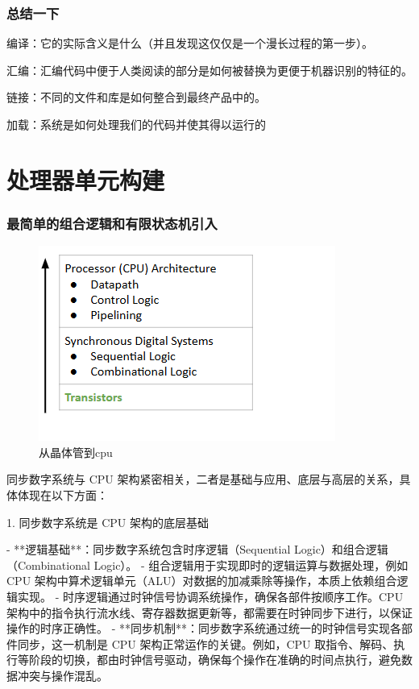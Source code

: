 \documentclass{ctexart}
\begin{document}
\subsubsection{总结一下}
编译：它的实际含义是什么（并且发现这仅仅是一个漫长过程的第一步）。\par
汇编：汇编代码中便于人类阅读的部分是如何被替换为更便于机器识别的特征的。\par
链接：不同的文件和库是如何整合到最终产品中的。\par
加载：系统是如何处理我们的代码并使其得以运行的\par
\section{处理器单元构建}
\subsubsection{最简单的组合逻辑和有限状态机引入}
\begin{figure}
    \centering
    \includegraphics[width=0.5\linewidth]{从晶体管到cpu.png}
    \caption{从晶体管到cpu}
    \label{fig:enter-label}
\end{figure}

同步数字系统与 CPU 架构紧密相关，二者是基础与应用、底层与高层的关系，具体体现在以下方面：  \par

1. 同步数字系统是 CPU 架构的底层基础  \par
- **逻辑基础**：同步数字系统包含时序逻辑（Sequential Logic）和组合逻辑（Combinational Logic）。  
    - 组合逻辑用于实现即时的逻辑运算与数据处理，例如 CPU 架构中算术逻辑单元（ALU）对数据的加减乘除等操作，本质上依赖组合逻辑实现。  
    - 时序逻辑通过时钟信号协调系统操作，确保各部件按顺序工作。CPU 架构中的指令执行流水线、寄存器数据更新等，都需要在时钟同步下进行，以保证操作的时序正确性。  
- **同步机制**：同步数字系统通过统一的时钟信号实现各部件同步，这一机制是 CPU 架构正常运作的关键。例如，CPU 取指令、解码、执行等阶段的切换，都由时钟信号驱动，确保每个操作在准确的时间点执行，避免数据冲突与操作混乱。  \par
\end{document}
